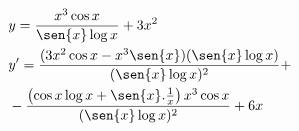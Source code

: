 \begin{ex}
\begin{align}
&y=\frac{x^3\cos{x}}{\sen{x}\log{x}}+3x^2\nonumber\\
&y'=\frac{(3x^2\cos{x}-x^3\sen{x})(\sen{x}\log{x})}{(\sen{x}\log{x})^2}+\nonumber\\
&-\frac{\left(\cos{x}\log{x}+\sen{x}.\frac{1}{x}\right)x^3\cos{x}}{(\sen{x}\log{x})^2}+6x\nonumber
\end{align}
\end{ex}